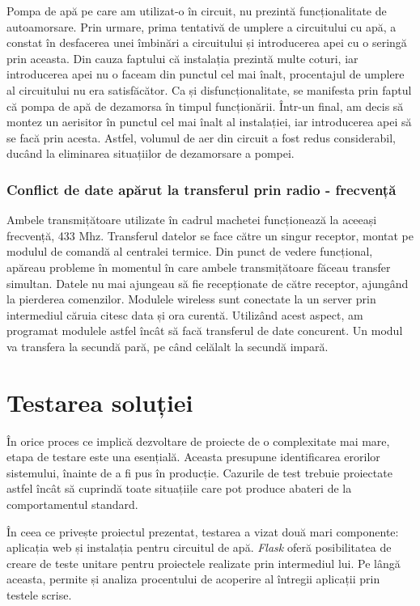 	Pompa de apă pe care am utilizat-o în circuit, nu prezintă funcționalitate de autoamorsare. Prin urmare, prima tentativă de umplere a circuitului cu apă, a constat în desfacerea unei îmbinări a circuitului și introducerea apei cu o seringă prin aceasta. Din cauza faptului că instalația prezintă multe coturi, iar introducerea apei nu o faceam din punctul cel mai înalt, procentajul de umplere al circuitului nu era satisfăcător. Ca și disfuncționalitate, se manifesta prin faptul că pompa de apă de dezamorsa în timpul funcționării. Într-un final, am decis să montez un aerisitor în punctul cel mai înalt al instalației, iar introducerea apei să se facă prin acesta. Astfel, volumul de aer din circuit a fost redus considerabil, ducând la eliminarea situațiilor de dezamorsare a pompei.

\subsubsection{Conflict de date apărut la transferul prin radio - frecvență}

	Ambele transmițătoare utilizate în cadrul machetei funcționează la aceeași frecvență, 433 Mhz. Transferul datelor se face către un singur receptor, montat pe modulul de comandă al centralei termice. Din punct de vedere funcțional, apăreau probleme în momentul în care ambele transmițătoare făceau transfer simultan. Datele nu mai ajungeau să fie recepționate de către receptor, ajungând la pierderea comenzilor. Modulele wireless sunt conectate la un server prin intermediul căruia citesc data și ora curentă. Utilizând acest aspect, am programat modulele astfel încât să facă transferul de date concurent. Un modul va transfera la secundă pară, pe când celălalt la secundă impară. 

\section{Testarea soluției}

	În orice proces ce implică dezvoltare de proiecte de o complexitate mai mare, etapa de testare este una esențială. Aceasta presupune identificarea erorilor sistemului, înainte de a fi pus în producție. Cazurile de test trebuie proiectate astfel încât să cuprindă toate situațiile care pot produce abateri de la comportamentul standard. 

	În ceea ce privește proiectul prezentat, testarea a vizat două mari componente: aplicația web și instalația pentru circuitul de apă. \textit{Flask} oferă posibilitatea de creare de teste unitare pentru proiectele realizate prin intermediul lui. Pe lângă aceasta, permite și analiza procentului de acoperire al întregii aplicații prin testele scrise.

